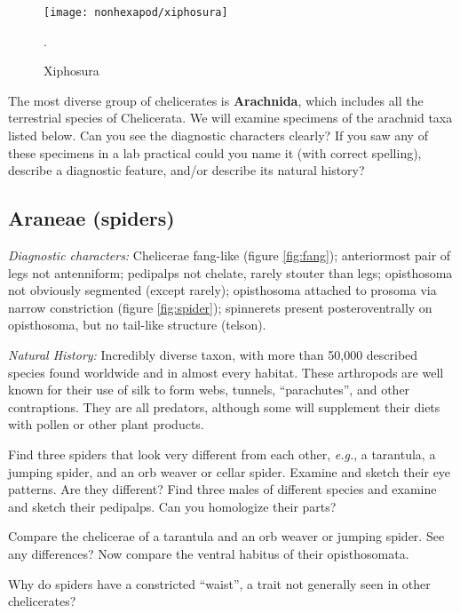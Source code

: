 \begin{figure}[ht!]
  \centering
    \texttt{[image: nonhexapod/xiphosura]}
  \caption{Xiphosura \citep[][Fig. 9]{bhlitem21199comstock}}.
  \label{fig:xipho}
\end{figure}

\noindent{}The most diverse group of chelicerates is \textbf{Arachnida}, which includes all the terrestrial species of Chelicerata. We will examine specimens of the arachnid taxa listed below. Can you see the diagnostic characters clearly? If you saw any of these specimens in a lab practical could you name it (with correct spelling), describe a diagnostic feature, and/or describe its natural history?

\subsection{Araneae (spiders)}
\noindent{}\textit{Diagnostic characters:} Chelicerae fang-like (figure \ref{fig:fang}); anteriormost pair of legs not antenniform; pedipalps not chelate, rarely stouter than legs; opisthosoma not obviously segmented (except rarely); opisthosoma attached to prosoma via narrow constriction (figure \ref{fig:spider}); spinnerets present posteroventrally on opisthosoma, but no tail-like structure (telson).\vspace{3mm}

\noindent{}\textit{Natural History:} Incredibly diverse taxon, with more than 50,000 described species found worldwide and in almost every habitat. These arthropods are well known for their use of silk to form webs, tunnels, ``parachutes'', and other contraptions. They are all predators, although some will supplement their diets with pollen or other plant products.\vspace{3mm}

\begin{theo}[Araneae]
{}Find three spiders that look very different from each other, \textit{e.g.}, a tarantula, a jumping spider, and an orb weaver or cellar spider. Examine and sketch their eye patterns. Are they different? Find three males of different species and examine and sketch their pedipalps. Can you homologize their parts?\vspace{3mm}

\noindent{}Compare the chelicerae of a tarantula and an orb weaver or jumping spider. See any differences? Now compare the ventral habitus of their opisthosomata.\vspace{3mm}

\noindent{}Why do spiders have a constricted ``waist'', a trait not generally seen in other chelicerates?
\end{theo}

